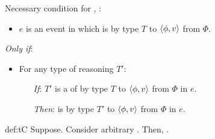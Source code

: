 \begin{note}
  Necessary condition for \tC{}, \rotoc{}:

  \begin{proposition}[\tC{2}]
    \label{def:tC}

    \noindent%

    \begin{itemize}
    \item
      \(e\) is an event in which \vAgent{} is \emph{} by type \(T\) to \(\langle \phi, v \rangle\) from \(\Phi\).
    \end{itemize}

    \emph{Only if}:

    \begin{itemize}[noitemsep]
    \item
      For any type of reasoning \(T'\):
      \begin{itemize}
      \item[\emph{If}:]
        \(T'\) is a \tRep{} of \vAgent{} \tC{} by type \(T\) to \(\langle \phi, v \rangle\) from \(\Phi\) in \(e\).
      \item[\emph{Then}:]
        \vAgent{} is \ptCV{} by type \(T'\) to \(\langle \phi, v \rangle\) from \(\Phi\) in \(e\).
      \end{itemize}
    \end{itemize}
    \vspace{-\baselineskip}
  \end{proposition}

  \begin{argument}{def:tC}
    Suppose.
    Consider arbitrary \tRep{}.
    Then, \ptC{}.
  \end{argument}
\end{note}


